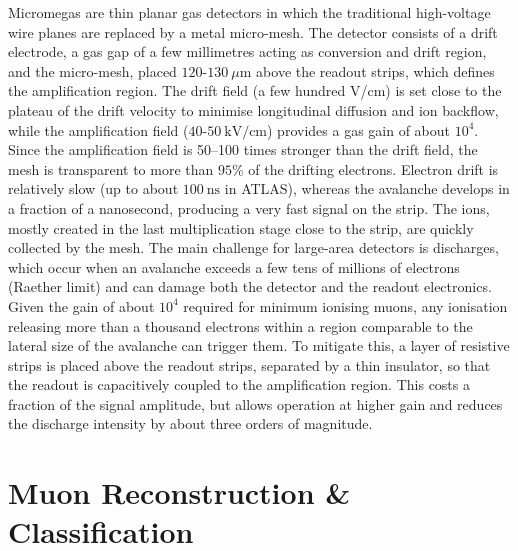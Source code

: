 \documentclass[11pt,a4paper,twoside,openright]{report}
\begin{document}
Micromegas \cite{ATLASdesc} are thin planar gas detectors in which the traditional high-voltage wire planes are replaced by a metal micro-mesh. The detector consists of a drift electrode, a gas gap of a few millimetres acting as conversion and drift region, and the micro-mesh, placed \(120\text{-}130\ \mu\text{m}\) above the readout strips, which defines the amplification region. The drift field (a few hundred V/cm) is set close to the plateau of the drift velocity to minimise longitudinal diffusion and ion backflow, while the amplification field (\(40\text{-}50\ \text{kV/cm}\)) provides a gas gain of about \(10^4\). Since the amplification field is 50--100 times stronger than the drift field, the mesh is transparent to more than \(95\%\) of the drifting electrons. Electron drift is relatively slow (up to about \(100\ \text{ns}\) in ATLAS), whereas the avalanche develops in a fraction of a nanosecond, producing a very fast signal on the strip. The ions, mostly created in the last multiplication stage close to the strip, are quickly collected by the mesh. The main challenge for large-area detectors is discharges, which occur when an avalanche exceeds a few tens of millions of electrons (Raether limit) and can damage both the detector and the readout electronics. Given the gain of about \(10^4\) required for minimum ionising muons, any ionisation releasing more than a thousand electrons within a region comparable to the lateral size of the avalanche can trigger them. To mitigate this, a layer of resistive strips is placed above the readout strips, separated by a thin insulator, so that the readout is capacitively coupled to the amplification region. This costs a fraction of the signal amplitude, but allows operation at higher gain and reduces the discharge intensity by about three orders of magnitude.



\chapter{Muon Reconstruction \& Classification}
\end{document}
